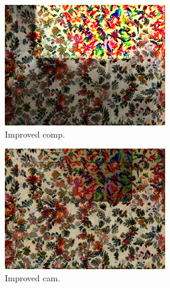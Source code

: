 \begin{figure}[]
\begin{subfigure}{\textwidth}
        \begin{subfigure}{0.24\textwidth}
            \centering
            \includegraphics[width=\textwidth]{images/04-experiment02/carpet/flowers/improved_im.jpg}
            \caption*{Improved comp.}
        \end{subfigure}
        \hfill
        \begin{subfigure}{0.24\textwidth}
            \centering
            \includegraphics[width=\textwidth]{images/04-experiment02/carpet/flowers/improved_proj.jpg}
            \caption*{Improved cam.}
        \end{subfigure}
        \hfill
        \begin{subfigure}{0.24\textwidth}
            \centering

\end{subfigure}
\end{subfigure}
\end{figure}
